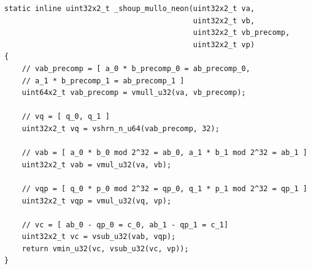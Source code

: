 \documentclass{article}
\begin{document}
\begin{lstlisting}[caption = Auxiliary function of Shoup's modular reduction (Version with multiply-low)]
static inline uint32x2_t _shoup_mullo_neon(uint32x2_t va,
                                           uint32x2_t vb,
                                           uint32x2_t vb_precomp,
                                           uint32x2_t vp)
{
    // vab_precomp = [ a_0 * b_precomp_0 = ab_precomp_0,
    // a_1 * b_precomp_1 = ab_precomp_1 ]
    uint64x2_t vab_precomp = vmull_u32(va, vb_precomp);

    // vq = [ q_0, q_1 ]
    uint32x2_t vq = vshrn_n_u64(vab_precomp, 32);

    // vab = [ a_0 * b_0 mod 2^32 = ab_0, a_1 * b_1 mod 2^32 = ab_1 ]
    uint32x2_t vab = vmul_u32(va, vb);

    // vqp = [ q_0 * p_0 mod 2^32 = qp_0, q_1 * p_1 mod 2^32 = qp_1 ]
    uint32x2_t vqp = vmul_u32(vq, vp);

    // vc = [ ab_0 - qp_0 = c_0, ab_1 - qp_1 = c_1]
    uint32x2_t vc = vsub_u32(vab, vqp);
    return vmin_u32(vc, vsub_u32(vc, vp));
}
\end{lstlisting}
\end{document}
